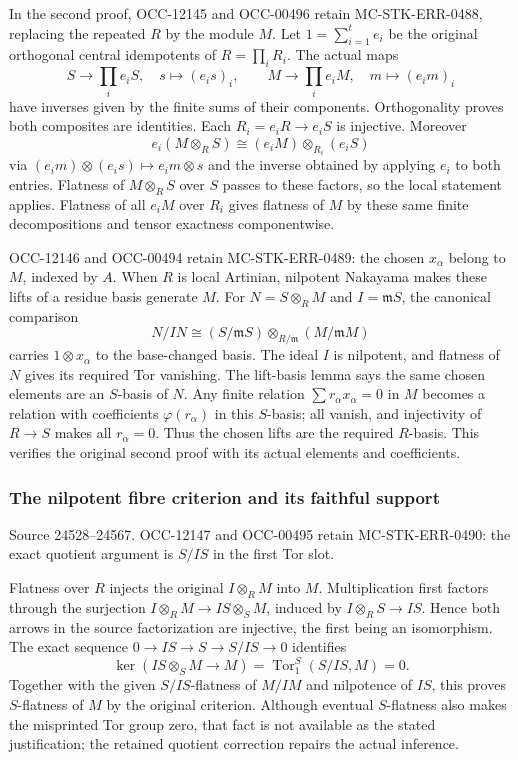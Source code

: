 In the second proof, OCC-12145 and OCC-00496 retain MC-STK-ERR-0488, replacing the repeated \(R\) by the module \(M\). Let \(1=\sum_{i=1}^t e_i\) be the original orthogonal central idempotents of \(R=\prod_i R_i\). The actual maps \[
S\longrightarrow\prod_i e_iS,\quad s\longmapsto(e_is)_i,
\qquad
M\longrightarrow\prod_i e_iM,\quad m\longmapsto(e_im)_i
\] have inverses given by the finite sums of their components. Orthogonality proves both composites are identities. Each \(R_i=e_iR\to e_iS\) is injective. Moreover \[
e_i(M\otimes_RS)\cong(e_iM)\otimes_{R_i}(e_iS)
\] via \((e_im)\otimes(e_is)\mapsto e_im\otimes s\) and the inverse obtained by applying \(e_i\) to both entries. Flatness of \(M\otimes_RS\) over \(S\) passes to these factors, so the local statement applies. Flatness of all \(e_iM\) over \(R_i\) gives flatness of \(M\) by these same finite decompositions and tensor exactness componentwise.

OCC-12146 and OCC-00494 retain MC-STK-ERR-0489: the chosen \(x_\alpha\) belong to \(M\), indexed by \(A\). When \(R\) is local Artinian, nilpotent Nakayama makes these lifts of a residue basis generate \(M\). For \(N=S\otimes_RM\) and \(I=\mathfrak mS\), the canonical comparison \[
N/IN\cong(S/\mathfrak mS)\otimes_{R/\mathfrak m}(M/\mathfrak mM)
\] carries \(1\otimes x_\alpha\) to the base-changed basis. The ideal \(I\) is nilpotent, and flatness of \(N\) gives its required Tor vanishing. The lift-basis lemma says the same chosen elements are an \(S\)-basis of \(N\). Any finite relation \(\sum r_\alpha x_\alpha=0\) in \(M\) becomes a relation with coefficients \(\varphi(r_\alpha)\) in this \(S\)-basis; all vanish, and injectivity of \(R\to S\) makes all \(r_\alpha=0\). Thus the chosen lifts are the required \(R\)-basis. This verifies the original second proof with its actual elements and coefficients.

\subsubsection{The nilpotent fibre criterion and its faithful support}\label{algebra-proof-017-the-nilpotent-fibre-criterion-and-its-faithful-support}

Source 24528--24567. OCC-12147 and OCC-00495 retain MC-STK-ERR-0490: the exact quotient argument is \(S/IS\) in the first Tor slot.

Flatness over \(R\) injects the original \(I\otimes_RM\) into \(M\). Multiplication first factors through the surjection \(I\otimes_RM\to IS\otimes_SM\), induced by \(I\otimes_RS\to IS\). Hence both arrows in the source factorization are injective, the first being an isomorphism. The exact sequence \(0\to IS\to S\to S/IS\to0\) identifies \[
\ker(IS\otimes_SM\to M)=\operatorname{Tor}_1^S(S/IS,M)=0.
\] Together with the given \(S/IS\)-flatness of \(M/IM\) and nilpotence of \(IS\), this proves \(S\)-flatness of \(M\) by the original criterion. Although eventual \(S\)-flatness also makes the misprinted Tor group zero, that fact is not available as the stated justification; the retained quotient correction repairs the actual inference.

